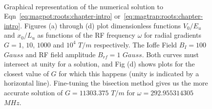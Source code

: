 \begin{figure}
\ 
\caption{Graphical representation of the numerical solution to Eqn~\ref{eq:magpot:roots:chapter-intro} or~\ref{eq:magtrap:roots:chapter-intro}. Figures (a) through (d) plot dimensionless functions $V_0/E_u$ and $x_0/L_u$ as functions of the RF frequency $\omega$ for radial gradients $G=1$, $10$, $1000$ and $10^4$ $T/m$ respectively. The Ioffe Field $B_I=100$ $Gauss$ and RF field amplitude $B_{rf}=1$ $Gauss$. Both curves must intersect at unity for a solution, and Fig (d) shows plots for  the closest value of $G$ for which this happens (unity is indicated by a horizontal line). Fine-tuning the bisection method gives us the more accurate solution of $G=11303.375$ $T/m$ for $\omega=292.955314305$ $MHz$.}
\label{fig:magplots:chapter-intro}
\end{figure}
